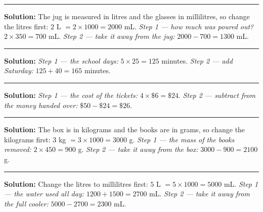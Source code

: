 \documentclass[12pt]{article}
\begin{document}
\vspace{0.2cm}\noindent\rule{\linewidth}{0.2pt}


\textbf{Solution:} The jug is measured in litres and the glasses in millilitres, so
change the litres first: $2$ L $= 2 \times 1000 = 2000$ mL.
\emph{Step 1 --- how much was poured out?} $2 \times 350 = 700$ mL.
\emph{Step 2 --- take it away from the jug:} $2000 - 700 = 1300$ mL.

\vspace{0.2cm}\noindent\rule{\linewidth}{0.2pt}


\textbf{Solution:} \emph{Step 1 --- the school days:} $5 \times 25 = 125$ minutes.
\emph{Step 2 --- add Saturday:} $125 + 40 = 165$ minutes.

\vspace{0.2cm}\noindent\rule{\linewidth}{0.2pt}


\textbf{Solution:} \emph{Step 1 --- the cost of the tickets:}
$4 \times \$6 = \$24$.
\emph{Step 2 --- subtract from the money handed over:} $\$50 - \$24 = \$26$.

\vspace{0.2cm}\noindent\rule{\linewidth}{0.2pt}


\textbf{Solution:} The box is in kilograms and the books are in grams, so change the
kilograms first: $3$ kg $= 3 \times 1000 = 3000$ g.
\emph{Step 1 --- the mass of the books removed:} $2 \times 450 = 900$ g.
\emph{Step 2 --- take it away from the box:} $3000 - 900 = 2100$ g.

\vspace{0.2cm}\noindent\rule{\linewidth}{0.2pt}


\textbf{Solution:} Change the litres to millilitres first:
$5$ L $= 5 \times 1000 = 5000$ mL.
\emph{Step 1 --- the water used all day:} $1200 + 1500 = 2700$ mL.
\emph{Step 2 --- take it away from the full cooler:} $5000 - 2700 = 2300$ mL.
\end{document}
